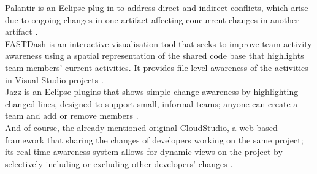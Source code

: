 Palantir is an Eclipse plug-in to address direct and indirect conflicts, which arise due to ongoing changes in one artifact affecting concurrent changes in another artifact \cite{ref22}. \\

FASTDash is an interactive visualisation tool that seeks to improve team activity awareness using a spatial representation of the shared code base that highlights team members' current activities. It provides file-level awareness of the activities in Visual Studio projects \cite{ref26}. \\

Jazz is an Eclipse plugins that shows simple change awareness by highlighting changed lines, designed to support small, informal teams; anyone can create a team and add or remove members \cite{ref27}. \\

And of course, the already mentioned original CloudStudio, a web-based framework that sharing the changes of developers working on the same project; its real-time awareness system allows for dynamic views on the project by selectively including or excluding other developers' changes \cite{ref12}.



